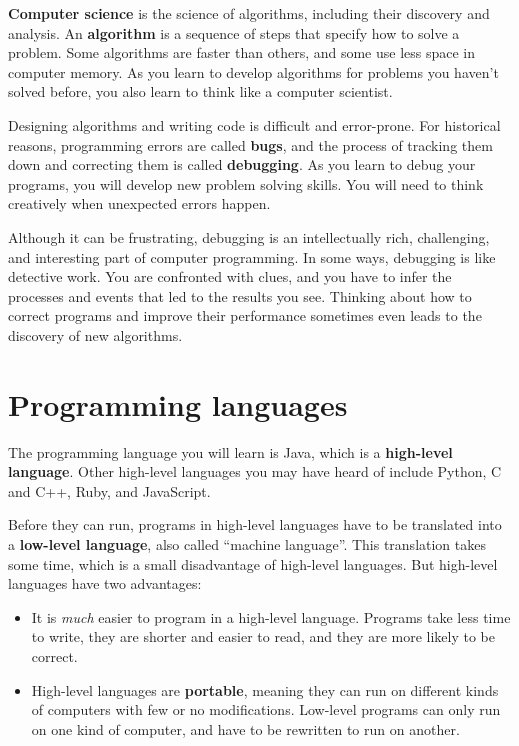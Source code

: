 \documentclass[12pt]{book}
\theoremstyle{exercise}
\begin{document}

{\bf Computer science} is the science of algorithms, including their discovery and analysis.
An {\bf algorithm} is a sequence of steps that specify how to solve a problem.
Some algorithms are faster than others, and some use less space in computer memory.
As you learn to develop algorithms for problems you haven't solved before, you also learn to think like a computer scientist.


Designing algorithms and writing code is difficult and error-prone.
For historical reasons, programming errors are called {\bf bugs}, and the process of tracking them down and correcting them is called {\bf debugging}.
As you learn to debug your programs, you will develop new problem solving skills.
You will need to think creatively when unexpected errors happen.

Although it can be frustrating, debugging is an intellectually rich, challenging, and interesting part of computer programming.
In some ways, debugging is like detective work.
You are confronted with clues, and you have to infer the processes and events that led to the results you see.
Thinking about how to correct programs and improve their performance sometimes even leads to the discovery of new algorithms.


\section{Programming languages}


The programming language you will learn is Java, which is a {\bf high-level language}.
Other high-level languages you may have heard of include Python, C and C++, Ruby, and JavaScript.


Before they can run, programs in high-level languages have to be translated into a {\bf low-level language}, also called ``machine language''.
This translation takes some time, which is a small disadvantage of high-level languages.
But high-level languages have two advantages:

\begin{itemize}

\item It is {\em much} easier to program in a high-level language.
Programs take less time to write, they are shorter and easier to read, and they are more likely to be correct.


\item High-level languages are {\bf portable}, meaning they can run on different kinds of computers with few or no modifications.
Low-level programs can only run on one kind of computer, and have to be rewritten to run on another.

\end{itemize}
\end{document}
